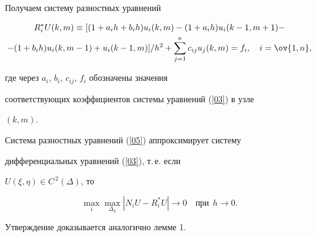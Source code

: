 Получаем систему разностных уравнений


\begin{multline}\label{05}


R^*_iU(k,m) \equiv [ (1 + a_ih + b_ih)u_i(k,m) -


(1+a_ih)u_i(k-1,m+1)- \\


- (1+b_ih)u_i(k,m-1) + u_i(k-1,m) ]/h^2 +


\sum_{j=1}^nc_{ij }u_j(k,m)=f_i, \quad i=\ov {1,n},


\end{multline}


где через $a_i$, $b_i$, $c_{ij}$, $f_i$ обозначены значения


соответствующих коэффициентов системы уравнений (\ref{03}) в узле


$(k,m)$.





Система разностных уравнений (\ref{05}) аппроксимирует систему


дифференциальных уравнений (\ref{03}), т.\,е. если


$U(\xi,\eta) \in C^{\,2}(\Delta)$, то


$$


\max_i \max_{\Delta_h}|N_iU - R^*_iU| \to


0\quad \text{при}\ \ h\to 0.


$$


Утверждение доказывается аналогично лемме 1.








